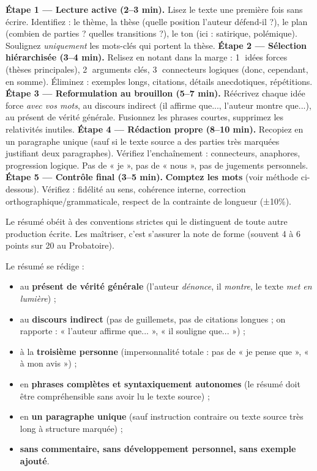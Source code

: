 \documentclass[11pt]{article}
\newcommand{\cle}[1]{{\popxbold\color{popdark}#1}}
\newcounter{popsec}
\newcounter{popsub}
\newcommand{\courssub}[1]{%
  \stepcounter{popsub}%
  \par\vspace{9pt}\noindent{\popxbold\fontsize{11.5}{13}\selectfont\color{popink}{\color{poporange}\thepopsec.\thepopsub}\hspace{6pt}#1}\par\nopagebreak\vspace{4pt}
}
\begin{document}
\begin{methode}
\textbf{Étape 1 — Lecture active (2--3 min).} Lisez le texte une première fois sans écrire. Identifiez : le thème, la thèse (quelle position l'auteur défend-il ?), le plan (combien de parties ? quelles transitions ?), le ton (ici : satirique, polémique). Soulignez \emph{uniquement} les mots-clés qui portent la thèse.
\textbf{Étape 2 — Sélection hiérarchisée (3--4 min).} Relisez en notant dans la marge : \textcircled{1} idées forces (thèses principales), \textcircled{2} arguments clés, \textcircled{3} connecteurs logiques (donc, cependant, en somme). Éliminez : exemples longs, citations, détails anecdotiques, répétitions.
\textbf{Étape 3 — Reformulation au brouillon (5--7 min).} Réécrivez chaque idée force \emph{avec vos mots}, au \cle{discours indirect} (il affirme que..., l'auteur montre que...), au \cle{présent de vérité générale}. Fusionnez les phrases courtes, supprimez les relativités inutiles.
\textbf{Étape 4 — Rédaction propre (8--10 min).} Recopiez en un paragraphe unique (sauf si le texte source a des parties très marquées justifiant deux paragraphes). Vérifiez l'enchaînement : connecteurs, anaphores, progression logique. Pas de « je », pas de « nous », pas de jugements personnels.
\textbf{Étape 5 — Contrôle final (3--5 min).} \textbf{Comptez les mots} (voir méthode ci-dessous). Vérifiez : fidélité au sens, cohérence interne, correction orthographique/grammaticale, respect de la contrainte de longueur (±10\%).
\end{methode}

\courssub{Rédaction : règles d'or et conventions}

Le résumé obéit à des conventions strictes qui le distinguent de toute autre production écrite. Les maîtriser, c'est s'assurer la note de \cle{forme} (souvent 4 à 6 points sur 20 au Probatoire).

\begin{propriete}
Le résumé se rédige :
\begin{itemize}
\item au \textbf{présent de vérité générale} (l'auteur \emph{dénonce}, il \emph{montre}, le texte \emph{met en lumière}) ;
\item au \textbf{discours indirect} (pas de guillemets, pas de citations longues ; on rapporte : « l'auteur affirme que... », « il souligne que... ») ;
\item à la \textbf{troisième personne} (impersonnalité totale : pas de « je pense que », « à mon avis ») ;
\item en \textbf{phrases complètes et syntaxiquement autonomes} (le résumé doit être compréhensible sans avoir lu le texte source) ;
\item en \textbf{un paragraphe unique} (sauf instruction contraire ou texte source très long à structure marquée) ;
\item \textbf{sans commentaire, sans développement personnel, sans exemple ajouté}.
\end{itemize}
\end{propriete}
\end{document}
